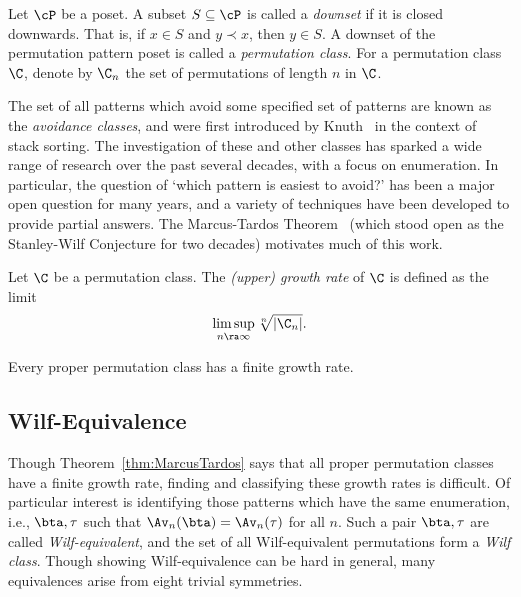 \documentclass[12pt,twoside]{memoir}
\begin{document}
      \begin{definition}\label{prelim:def:class}
        Let $\cP$ be a poset. A subset $S \subseteq \cP$ is called a
        \emph{downset} if it is closed downwards. That is, if $x \in S$ and $y
        \prec x$, then $y \in S$. 
        A downset of the permutation pattern poset is called a \emph{permutation
        class}. For a permutation class $\C$, denote by $\C_n$ the set of
        permutations of length $n$ in $\C$. 
      \end{definition}


      The set of all patterns which avoid some specified set of patterns are
      known as the \emph{avoidance classes}, and were first introduced by
      Knuth~\cite{Knuth} in the context of stack sorting.  The investigation of
      these and other classes has sparked a wide range of research over the past
      several decades, with a focus on enumeration.  In
      particular, the question of `which pattern is easiest to avoid?' has been a
      major open question for many years, and a variety of techniques have been
      developed to provide partial answers. The Marcus-Tardos
      Theorem~\cite{MarcusTardos} (which stood open as the Stanley-Wilf
      Conjecture for two decades) motivates much of this work.

      \begin{definition} \label{prelim:def:growthrate}
        Let $\C$ be a permutation class. The \emph{(upper) growth rate} of $\C$ is
        defined as the limit
        $$ \limsup_{n \ra \infty} \sqrt[n]{|\C_n|}.$$
      \end{definition}

      \begin{theorem} \label{thm:MarcusTardos}
        Every proper permutation class has a finite growth rate. 
      \end{theorem}



    \subsection{Wilf-Equivalence}
      
      Though Theorem~\ref{thm:MarcusTardos} says that all proper permutation classes
      have a finite growth rate, finding and classifying these growth
      rates is difficult. Of particular interest is identifying
      those patterns which have the same enumeration, i.e., $\bta, \tau$ such
      that $\Av_n(\bta) = \Av_n(\tau)$ for all $n$. Such a pair $\bta, \tau$ are
      called \emph{Wilf-equivalent}, and the set of all Wilf-equivalent
      permutations form a \emph{Wilf class}. Though showing Wilf-equivalence can be
      hard in general, many equivalences arise from eight trivial symmetries. 
\end{document}

